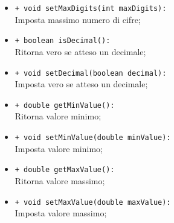 \begin{flushleft}
\begin{itemize}
\begin{sloppypar}
\begin{itemize}
\item \texttt{+ void setMaxDigits(int maxDigits):}\\ Imposta massimo numero di cifre;
\item \texttt{+ boolean isDecimal():}\\ Ritorna vero se atteso un decimale;
\item \texttt{+ void setDecimal(boolean decimal):}\\ Imposta vero se atteso un decimale;
\item \texttt{+ double getMinValue():}\\ Ritorna valore minimo;
\item \texttt{+ void setMinValue(double minValue):}\\ Imposta valore minimo;
\item \texttt{+ double getMaxValue():}\\ Ritorna valore massimo;
\item \texttt{+ void setMaxValue(double maxValue):}\\ Imposta valore massimo;
\end{itemize}
\end{sloppypar}
\end{itemize}
\end{flushleft}

